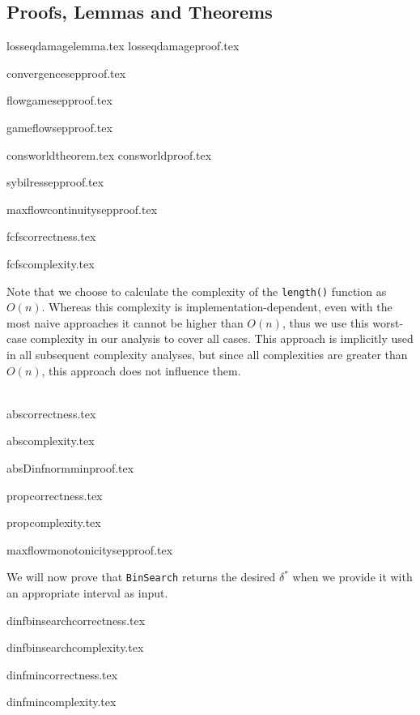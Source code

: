 \subsection{Proofs, Lemmas and Theorems}
{losseqdamagelemma.tex}
{losseqdamageproof.tex}

{convergencesepproof.tex}

{flowgamesepproof.tex}

{gameflowsepproof.tex}

{consworldtheorem.tex}
{consworldproof.tex}

{sybilressepproof.tex}

{maxflowcontinuitysepproof.tex}

{fcfscorrectness.tex}

{fcfscomplexity.tex}

Note that we choose to calculate the complexity of the \texttt{length()} function as $O\left(n\right)$. Whereas this
complexity is implementation-dependent, even with the most naive approaches it cannot be higher than $O\left(n\right)$,
thus we use this worst-case complexity in our analysis to cover all cases. This approach is implicitly used in all
subsequent complexity analyses, but since all complexities are greater than $O\left(n\right)$, this approach does not
influence them.

\ \\

{abscorrectness.tex}

{abscomplexity.tex}

{absDinfnormminproof.tex}

{propcorrectness.tex}

{propcomplexity.tex}

{maxflowmonotonicitysepproof.tex}

We will now prove that \texttt{BinSearch} returns the desired $\delta^*$ when we provide it with an appropriate interval as
input.

{dinfbinsearchcorrectness.tex}

{dinfbinsearchcomplexity.tex}

{dinfmincorrectness.tex}

{dinfmincomplexity.tex}
